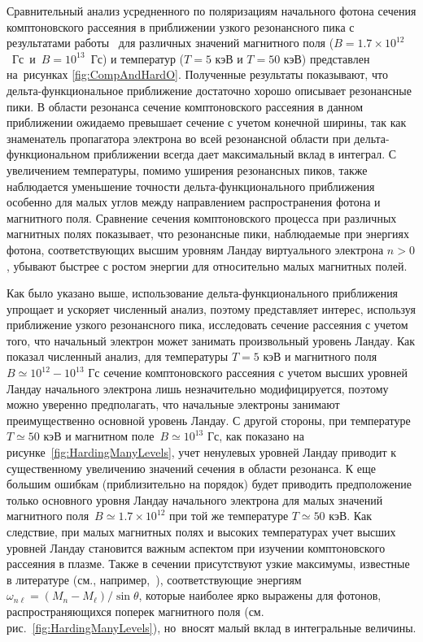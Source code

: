 Сравнительный анализ усредненного по поляризациям начального фотона сечения 
комптоновского рассеяния в приближении узкого резонансного  пика с результатами 
работы~\cite{Harding:1991} для различных значений магнитного поля 
(\mbox{$B=1.7\times10^{12}$ Гс и $B=10^{13}$ Гс}) и 
температур ($T=5$ кэВ и $T=50$ кэВ) представлен на~рисунках 
\ref{fig:CompAndHardO}. Полученные результаты показывают, что 
дельта-функциональное приближение достаточно хорошо описывает резонансные пики. 
В области резонанса сечение комптоновского рассеяния в данном приближении 
ожидаемо превышает сечение с учетом конечной ширины, так как знаменатель 
пропагатора электрона во всей резонансной области при дельта-функциональном 
приближении всегда дает максимальный вклад в интеграл. С увеличением 
температуры, помимо уширения резонансных пиков, также наблюдается уменьшение 
точности дельта-функционального приближения особенно для малых углов между 
направлением распространения фотона и магнитного поля.  Сравнение сечения 
комптоновского процесса 
при различных магнитных полях показывает, что резонансные пики, наблюдаемые при 
энергиях фотона, соответствующих высшим уровням Ландау виртуального электрона 
$n>0$, убывают быстрее с ростом энергии для относительно малых магнитных полей.

Как было указано выше, использование дельта-функционального приближения 
упрощает и ускоряет численный анализ, поэтому представляет интерес, используя 
приближение узкого резонансного пика, исследовать сечение рассеяния с учетом 
того, что начальный электрон может занимать произвольный уровень Ландау. Как 
показал численный анализ, для температуры $T=5$ кэВ и магнитного поля 
$B\simeq10^{12}-10^{13}$ Гс сечение комптоновского рассеяния с учетом высших 
уровней Ландау начального электрона лишь незначительно модифицируется, поэтому 
можно уверенно предполагать, что начальные электроны занимают преимущественно 
основной уровень Ландау. С другой стороны, при температуре $T\simeq50$ кэВ и 
магнитном поле~$B\simeq 10^{13}$ Гс, как показано на 
рисунке~\ref{fig:HardingManyLevels}, учет ненулевых уровней Ландау приводит к 
существенному увеличению значений сечения в области резонанса. К еще большим 
ошибкам (приблизительно на порядок)  будет приводить предположение только 
основного уровня Ландау начального электрона для малых значений магнитного 
поля~$B\simeq1.7\times10^{12}$ при той же температуре $T\simeq50$ кэВ.  Как 
следствие, при малых магнитных полях и высоких температурах учет высших уровней 
Ландау становится важным аспектом при изучении комптоновского рассеяния в 
плазме. Также в сечении присутствуют узкие максимумы, известные в литературе 
(см., например,~\cite{Pavlov:1991,Klepikov:1954,Baier:2007}), соответствующие 
энергиям $\omega_{n\ell}=(M_n-M_\ell)/\sin \theta$, которые наиболее ярко 
выражены для фотонов, распространяющихся поперек магнитного поля (см.~ 
рис.~\ref{fig:HardingManyLevels}), но~вносят малый вклад в интегральные 
величины.



